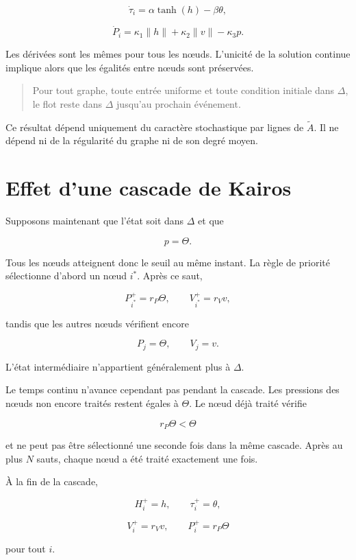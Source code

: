 \[
\dot\tau_i
=
\alpha\tanh(h)-\beta\theta,
\]

\[
\dot P_i
=
\kappa_1\|h\|
+
\kappa_2\|v\|
-
\kappa_3p.
\]

Les dérivées sont les mêmes pour tous les nœuds. L'unicité de la
solution continue implique alors que les égalités entre nœuds sont
préservées.

\begin{quote}
Pour tout graphe, toute entrée uniforme et toute condition initiale
dans \(\Delta\), le flot reste dans \(\Delta\) jusqu'au prochain
événement.
\end{quote}

Ce résultat dépend uniquement du caractère stochastique par lignes de
\(\widetilde A\). Il ne dépend ni de la régularité du graphe ni de son
degré moyen.

\section{Effet d'une cascade de Kairos}
\label{annexe-reduction-cascade}

Supposons maintenant que l'état soit dans \(\Delta\) et que

\[
p=\Theta.
\]

Tous les nœuds atteignent donc le seuil au même instant. La règle de
priorité sélectionne d'abord un nœud \(i^\ast\). Après ce saut,

\[
P_{i^\ast}^+=r_P\Theta,
\qquad
V_{i^\ast}^+=r_Vv,
\]

tandis que les autres nœuds vérifient encore

\[
P_j=\Theta,
\qquad
V_j=v.
\]

L'état intermédiaire n'appartient généralement plus à \(\Delta\).

Le temps continu n'avance cependant pas pendant la cascade. Les
pressions des nœuds non encore traités restent égales à \(\Theta\).
Le nœud déjà traité vérifie

\[
r_P\Theta<\Theta
\]

et ne peut pas être sélectionné une seconde fois dans la même
cascade. Après au plus \(N\) sauts, chaque nœud a été traité exactement
une fois.

À la fin de la cascade,

\[
H_i^+=h,
\qquad
\tau_i^+=\theta,
\]

\[
V_i^+=r_Vv,
\qquad
P_i^+=r_P\Theta
\]

pour tout \(i\).

